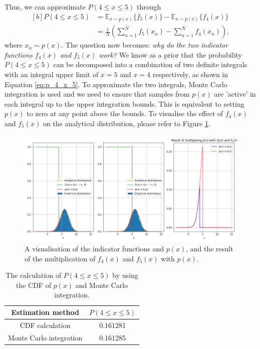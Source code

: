 \documentclass{article}
\begin{document}
Thus, we can approximate $P(4 \leq x \leq 5)$ through
\begin{equation}
\begin{aligned}[b]
P(4 \leq x \leq 5) &= \mathbb{E}_{x\sim p(x)} \{f_5(x)\} - \mathbb{E}_{x\sim p(x)} \{f_4(x)\} \\
&= \frac{1}{N} \left( \sum_{n=1}^{N}f_5(x_n) - \sum_{n=1}^{N}f_4(x_n) \right),
\end{aligned}
\end{equation}
where $x_n \sim p(x)$. The question now becomes: \emph{why do the two indicator functions $f_4(x)$ and $f_5(x)$ work?} We know as a prior that the probability $P(4 \leq x \leq 5)$ can be decomposed into a combination of two definite integrals with an integral upper limit of $x = 5$ and $x= 4$ respectively, as shown in Equation \eqref{eq:p_4_x_5}. To approximate the two integrals, Monte Carlo integration is used and we need to ensure that samples from $p(x)$ are 'active' in each integral up to the upper integration bounds. This is equivalent to setting $p(x)$ to zero at any point above the bounds. To visualise the effect of $f_4(x)$ and $f_5(x)$ on the analytical distribution, please refer to Figure \ref{fig:Q1a_3}.
\begin{figure}
    \centering
    \includegraphics[scale=0.5]{Q1a_fig5.png}
    \caption{A visualisation of the indicator functions and $p(x)$, and the result of the multiplication of $f_4(x)$ and $f_5(x)$ with $p(x)$.}
    \label{fig:Q1a_3}
\end{figure}

\begin{table}[!htb]
\centering
\caption{The calculation of $P(4 \leq x \leq 5)$ by using the CDF of $p(x)$ and Monte Carlo integration.}
\label{tab:probability_calculation}
\begin{tabular}{@{}cc@{}}
\toprule
Estimation method & $P(4 \leq x \leq 5)$ \\ \midrule
CDF calculation & 0.161281 \\
Monte Carlo integration & 0.161285 \\ \bottomrule
\end{tabular}
\end{table}
\end{document}

